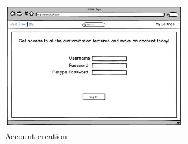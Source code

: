 \begin{figure}[!ht]
      \centering
      \includegraphics[width=0.7\textwidth]{createAcct}
      \caption{Account creation}	
\end{figure}
